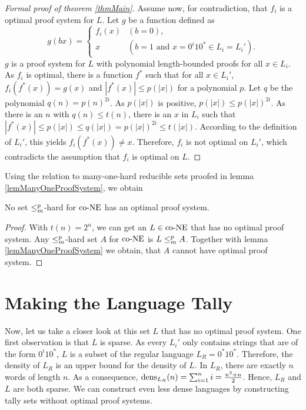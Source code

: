 \begin{proof}[Formal proof of theorem \ref{thmMain}]
    Assume now, for contradiction, that \(f_i\) is a optimal proof system for \(L\). Let \(g\) be a function defined as
      \[ g(bx) = \begin{cases}
                  f_i(x) & (b = 0), \\
                  x & (b = 1 \text{ and } x = 0^i10^* \in L_i = L_i').
                 \end{cases} \]
    \(g\) is a proof system for \(L\) with polynomial length-bounded proofs for all \(x \in L_i\). As \(f_i\) is optimal, there is a function \(f^*\) such that for all \(x \in L_i'\), \(f_i(f^*(x)) = g(x)\) and \(|f^*(x)| \leq p(|x|)\) for a polynomial \(p\). Let \(q\) be the polynomial \(q(n) = p(n)^{2i}\). As \(p(|x|)\) is positive, \(p(|x|) \leq p(|x|)^{2i}\). As there is an \(n\) with \(q(n) \leq t(n)\), there is an \(x\) in \(L_i\) such that \(|f^*(x)| \leq p(|x|) \leq q(|x|) = p(|x|)^{2i} \leq t(|x|)\). According to the definition of \(L_i'\), this yields \(f_i(f^*(x)) \neq x\). Therefore, \(f_i\) is not optimal on \(L_i'\), which contradicts the assumption that \(f_i\) is optimal on \(L\).
  \end{proof}

  Using the relation to many-one-hard reducible sets proofed in lemma \ref{lemManyOneProofSystem}, we obtain

  \begin{corollary} \label{corHardSets}
    No set \(\leq_{m}^{p}\)-hard for \(\text{co-NE}\) has an optimal proof system.
  \end{corollary}

  \begin{proof}
    With \(t(n) = 2^n\), we can get an \(L \in \text{co-NE}\) that has no optimal proof system. Any \(\leq_{m}^{p}\)-hard set \(A\) for \(\text{co-NE}\) is \(L \leq_{m}^{p} A\). Together with lemma \ref{lemManyOneProofSystem} we obtain, that \(A\) cannot have optimal proof system.
  \end{proof}

  \section{Making the Language Tally}

  Now, let us take a closer look at this set \(L\) that has no optimal proof system. One first observation is that \(L\) is sparse. As every \(L_i'\) only contains strings that are of the form \(0^i10^*\), \(L\) is a subset of the regular language \(L_R = 0^*10^*\). Therefore, the density of \(L_R\) is an upper bound for the density of \(L\). In \(L_R\), there are exactly \(n\) words of length \(n\). As a consequence, \(\operatorname{dens}_{L_R}(n) = \sum_{i=1}^n i = \frac{n^2 + n}{2}\). Hence, \(L_R\) and \(L\) are both sparse. We can construct even less dense languages by constructing tally sets without optimal proof systems.

